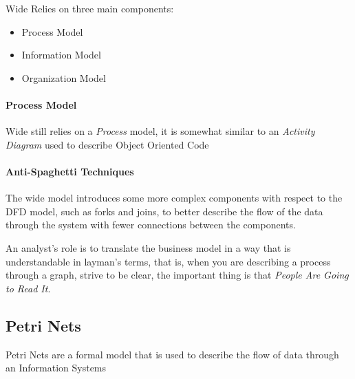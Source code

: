 \documentclass[openright, twoside, twocolumn]{report}
\begin{document}
    Wide Relies on three main components:

    \begin{itemize}
      \item Process Model
      \item Information Model
      \item Organization Model
    \end{itemize}

    \paragraph{Process Model}
    Wide still relies on a \emph{Process} model, it is somewhat similar to an \emph{Activity Diagram} used
    to describe Object Oriented Code

    \paragraph{Anti-Spaghetti Techniques}

    The wide model introduces some more complex components with respect to the DFD model, such as forks and joins,
    to better describe the flow of the data through the system with fewer connections between the components.

    \begin{remark}
      An analyst's role is to translate the business model in a way that is understandable in layman's terms,
      that is, when you are describing a process through a graph, strive to be clear, the important thing
      is that \emph{People Are Going to Read It}.
    \end{remark}

    \subsection{Petri Nets}

    Petri Nets are a formal model that is used to describe the flow of data through an Information Systems
\end{document}
